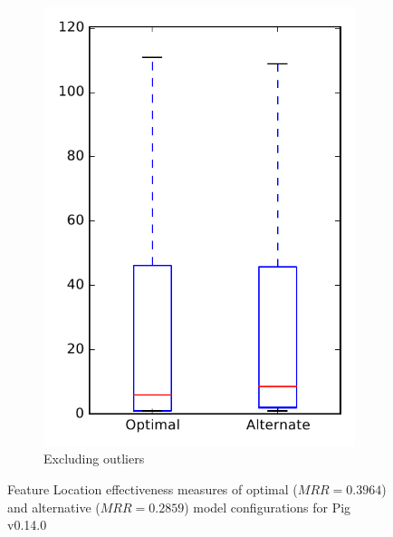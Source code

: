 \begin{figure}
\begin{subfigure}{.4\textwidth}
        \includegraphics[height=0.4\textheight]{figures/combo/flt_rq1_pig_no_outlier}
        \caption{Excluding outliers}\label{fig:combo:flt:rq1:pig_no_outlier}
    \end{subfigure}
\caption[Feature Location effectiveness measures of optimal and alternative model configurations for Pig v0.14.0]%
{Feature Location effectiveness measures of optimal ($MRR=0.3964$) and alternative ($MRR=0.2859$) model configurations for Pig v0.14.0}
\label{fig:combo:flt:rq1:pig}
\end{figure}
